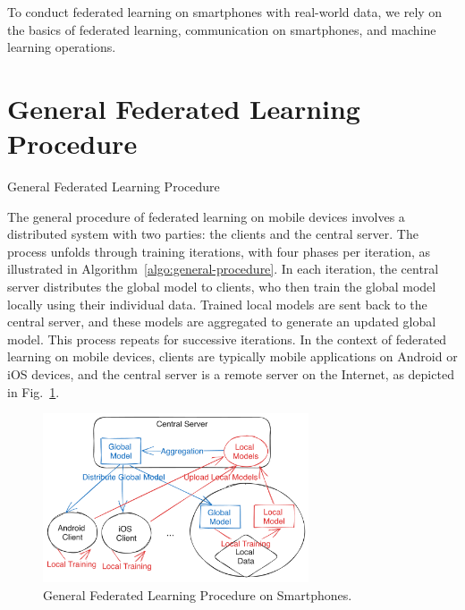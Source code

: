 To conduct federated learning on smartphones with real-world data,
we rely on the basics of federated learning, communication on smartphones,
and machine learning operations.

\section{General Federated Learning Procedure}

\begin{algorithm}
    \caption{General Federated Learning Procedure}
    \label{algo:general-procedure}
\end{algorithm}

The general procedure of federated learning on mobile devices involves a
distributed system with two parties: the clients and the central server.
The process unfolds through training iterations, with four phases per iteration,
as illustrated in Algorithm~\ref{algo:general-procedure}. In each iteration,
the central server distributes the global model to clients,
who then train the global model locally using their individual data.
Trained local models are sent back to the central server,
and these models are aggregated to generate an updated global model.
This process repeats for successive iterations.
In the context of federated learning on mobile devices,
clients are typically mobile applications on Android or iOS devices,
and the central server is a remote server on the Internet,
as depicted in Fig.~\ref{fig:general-fl}.

\begin{figure}\begin{center}
\includegraphics[width=0.7\textwidth]{general_fl.png}
    \caption{General Federated Learning Procedure on Smartphones.}
    \label{fig:general-fl}
\end{center}\end{figure}

